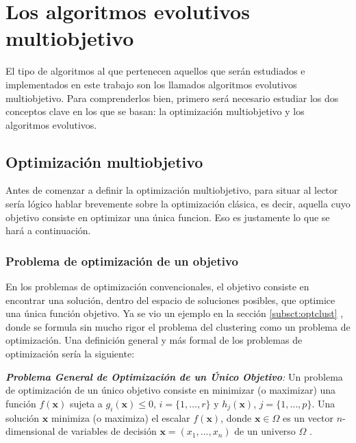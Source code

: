 \chapter{Los algoritmos evolutivos multiobjetivo}\label{ch:multiobj}

El tipo de algoritmos al que pertenecen aquellos que serán estudiados e implementados en este trabajo son los llamados algoritmos evolutivos multiobjetivo. Para comprenderlos bien, primero será necesario estudiar los dos conceptos clave en los que se basan: la optimización multiobjetivo y los algoritmos evolutivos.

\section{Optimización multiobjetivo}

Antes de comenzar a definir la optimización multiobjetivo, para situar al lector sería lógico hablar brevemente sobre la optimización clásica, es decir, aquella cuyo objetivo consiste en optimizar una única funcion. Eso es justamente lo que se hará a continuación.

\subsection{Problema de optimización de un objetivo}

En los problemas de optimización convencionales, el objetivo consiste en encontrar una solución, dentro del espacio de soluciones posibles, que optimice una única función objetivo. Ya se vio un ejemplo en la sección \ref{subsct:optclust} , donde se formula sin mucho rigor el problema del clustering como un problema de optimización. Una definición general y más formal de los problemas de optimización sería la siguiente:

\begin{definicion}
	
	\emph{\textbf{Problema General de Optimización de un Único Objetivo}:} Un problema de optimización de un único objetivo consiste en minimizar (o maximizar) una función $f(\textbf{x})$ sujeta a $g_i(\textbf{x}) \leq 0$, $i = \{1, \dots, r\}$ y $h_j(\textbf{x})$, $j = \{ 1, \dots, p\}$. Una solución $\textbf{x}$ minimiza (o maximiza) el escalar $f(\textbf{x})$, donde $\textbf{x} \in \Omega$ es un vector $n$-dimensional de variables de decisión $\textbf{x} = (x_1,\dots,x_n)$ de un universo $\Omega$ \cite{coello2007evolutionary}. 
	
\end{definicion}

